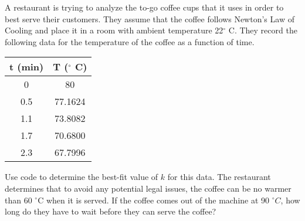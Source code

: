 \begin{exercise}
A restaurant is trying to analyze the to-go coffee cups that it uses in order to best serve their customers. They assume that the coffee follows Newton's Law of Cooling and place it in a room with ambient temperature 22$^\circ$ C. They record the following data for the temperature of the coffee as a function of time.
\begin{table}[h!!]
    \centering
    \begin{tabular}{|c|c|}\hline
         \textbf{t} (min)& \textbf{T} ($^\circ$ C)  \\ \hline
        0 & 80 \\
         0.5 & 77.1624 \\
         1.1 & 73.8082 \\
         1.7 & 70.6800 \\
         2.3 & 67.7996 \\ \hline
    \end{tabular}
\end{table}
\begin{tasks}
\task Use code to determine the best-fit value of $k$ for this data.
\task The restaurant determines that to avoid any potential legal issues, the coffee can be no warmer than 60 $^\circ$C when it is served. If the coffee comes out of the machine at 90 $^\circ C$, how long do they have to wait before they can serve the coffee?
\end{tasks}
\end{exercise}

\newpage

